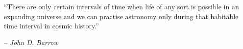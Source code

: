 \thispagestyle{empty}

\vspace*{0.4\textwidth}

{\large
``There are only certain intervals of time when life of any sort is possible in an expanding universe and we can practise astronomy only during that habitable time interval in cosmic history.'' \\
\vspace{-2mm}

\begin{flushright}
 -- \emph{John D. Barrow}
\end{flushright}
}

\vfill